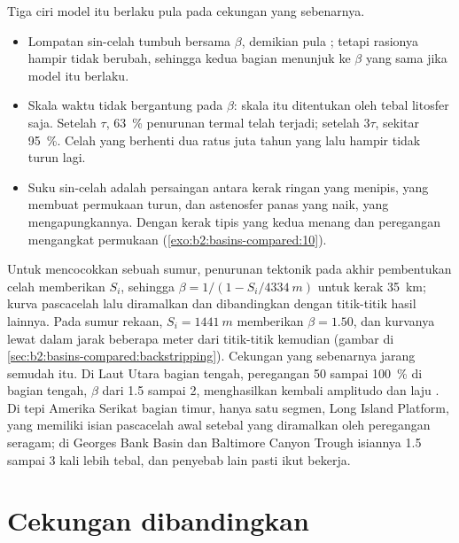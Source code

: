 Tiga ciri model itu berlaku pula pada cekungan yang sebenarnya.
\begin{itemize}
  \item Lompatan sin-celah tumbuh bersama $\beta$, demikian pula ; tetapi
        rasionya hampir tidak berubah, sehingga kedua bagian menunjuk ke $\beta$ yang sama jika model itu berlaku.
  \item Skala waktu  tidak bergantung pada $\beta$: skala itu ditentukan oleh
        tebal litosfer saja. Setelah $\tau$, \qty{63}{\percent} penurunan termal
        telah terjadi; setelah $3\tau$, sekitar \qty{95}{\percent}. Celah yang berhenti dua
        ratus juta tahun yang lalu hampir tidak turun lagi.
  \item Suku sin-celah adalah persaingan antara kerak ringan yang menipis, yang membuat
        permukaan turun, dan astenosfer panas yang naik, yang mengapungkannya. Dengan kerak tipis
        yang kedua menang dan peregangan mengangkat permukaan (\cref{exo:b2:basins-compared:10}).
\end{itemize}

Untuk mencocokkan sebuah sumur, penurunan tektonik pada akhir pembentukan celah memberikan $S_i$, sehingga
$\beta = 1/(1 - S_i/\qty{4334}{m})$ untuk kerak \qty{35}{km}; kurva pascacelah lalu diramalkan
dan dibandingkan dengan titik-titik hasil  lainnya. Pada sumur rekaan, $S_i = \qty{1441}{m}$
memberikan $\beta = 1.50$, dan kurvanya lewat dalam jarak beberapa meter dari titik-titik kemudian (gambar di
\cref{sec:b2:basins-compared:backstripping}). Cekungan yang sebenarnya jarang semudah itu. Di
Laut Utara bagian tengah, peregangan 50 sampai \qty{100}{\percent} di bagian tengah, $\beta$ dari 1.5 sampai 2,
menghasilkan kembali amplitudo dan laju . Di tepi Amerika Serikat
bagian timur, hanya satu segmen, Long Island Platform, yang memiliki isian pascacelah awal setebal
yang diramalkan oleh peregangan seragam; di Georges Bank Basin dan Baltimore Canyon Trough
isiannya 1.5 sampai 3 kali lebih tebal, dan penyebab lain pasti ikut bekerja.

\section{Cekungan dibandingkan}\label{sec:b2:basins-compared:compared}

